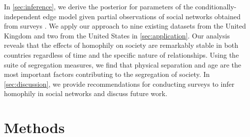 \documentclass{scrartcl}
\begin{document}


In \cref{sec:inference}, we derive the posterior for parameters of the conditionally-independent edge model given partial observations of social networks obtained from surveys%
. We apply our approach to nine existing datasets from the United Kingdom and two from the United States in \cref{sec:application}. Our analysis reveals that the effects of homophily on society are remarkably stable in both countries regardless of time and the specific nature of relationships. Using the suite of segregation measures, we find that physical separation and age are the most important factors contributing to the segregation of society. In \cref{sec:discussion}, we provide recommendations for conducting surveys to infer homophily in social networks and discuss future work.%

\section{Methods}
\end{document}
